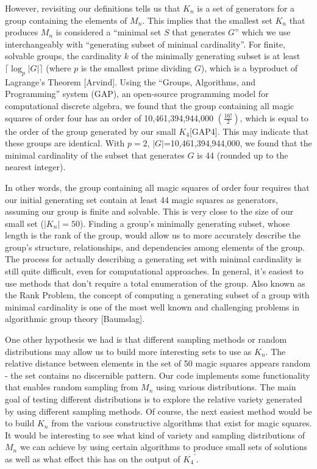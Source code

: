 \documentclass[12pt]{report}
\begin{document}
\par However, revisiting our definitions tells us that $K_n$ is a set of generators for a group
containing the elements of $M_n$. This implies that the smallest set $K_n$ that produces $M_n$ is
considered a ``minimal set $S$ that generates $G$'' which we  use interchangeably with ``generating
subset of minimal cardinality''. For finite, solvable groups, the cardinality $k$ of the minimally
generating subset is at least $\lceil\log_{p}{\left|G\right|}\rceil$ (where $p$ is the smallest
prime dividing $G$), which is a byproduct of Lagrange's Theorem [Arvind]. Using the ``Groups,
Algorithms, and Programming'' system (GAP), an open-source programming model for computational
discrete algebra, we found that the group containing all magic squares of order four has an order
of 10,461,394,944,000 $\left(\frac{16!}{2}\right)$, which is equal to the order of the group
generated by our small $K_4$[GAP4]. This may indicate that these groups are identical. With $p=2$,
$\left|G\right|$=10,461,394,944,000, we found that the minimal cardinality of the subset that
generates $G$ is 44 (rounded up to the nearest integer).

\par In other words, the group containing all magic squares of order four requires that our initial
generating set contain at least 44 magic squares as generators, assuming our group is finite and
solvable. This is very close to the size of our small set ($\left|K_n\right|=50$). Finding a
group's minimally generating subset, whose length is the rank of the group, would allow us to more
accurately describe the group's structure, relationships, and dependencies among elements of the
group. The process for actually describing a generating set with minimal cardinality is still quite
difficult, even for computational approaches. In general, it's easiest to use methods that don't
require a total enumeration of the group. Also known as the Rank Problem, the concept of computing
a generating subset of a group with minimal cardinality is one of the most well known and
challenging problems in algorithmic group theory [Baumslag].

\par One other hypothesis we had is that different sampling methods or random distributions may
allow us to build more interesting sets to use as $K_n$. The relative distance between elements in
the set of 50 magic squares appears random \hyphen{} the set contains no discernible pattern. Our
code implements some functionality that enables random sampling from $M_n$ using various
distributions. The main goal of testing different distributions is to explore the relative variety
generated by using different sampling methods. Of course, the next easiest method would be to build
$K_n$ from the various constructive algorithms that exist for magic squares. It would be
interesting to see what kind of variety and sampling distributions of $M_n$ we can achieve by using
certain algorithms to produce small sets of solutions as well as what effect this has on the output
of ${K_4}^\prime$.
\end{document}
